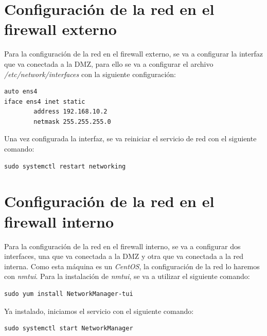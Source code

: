\documentclass[11pt]{report}
\begin{document}
\section{Configuración de la red en el firewall externo}
Para la configuración de la red en el firewall externo, se va a configurar la interfaz que
va conectada a la DMZ, para ello se va a configurar el archivo \emph{/etc/network/interfaces}
con la siguiente configuración:
\begin{verbatim}
auto ens4
iface ens4 inet static
        address 192.168.10.2
        netmask 255.255.255.0
\end{verbatim}

Una vez configurada la interfaz, se va reiniciar el servicio de red con el siguiente comando: \\
\begin{BVerbatim}
sudo systemctl restart networking
\end{BVerbatim}

\cleardoublepage

\section{Configuración de la red en el firewall interno}
Para la configuración de la red en el firewall interno, se va a configurar dos interfaces, una
que va conectada a la DMZ y otra que va conectada a la red interna. Como esta máquina es un \emph{CentOS},
la configuración de la red lo haremos con \emph{nmtui}. Para la instalación de \emph{nmtui}, se va a utilizar
el siguiente comando:
\begin{BVerbatim}
sudo yum install NetworkManager-tui
\end{BVerbatim}

Ya instalado, iniciamos el servicio con el siguiente comando:
\begin{BVerbatim}
sudo systemctl start NetworkManager
\end{BVerbatim}
\end{document}
